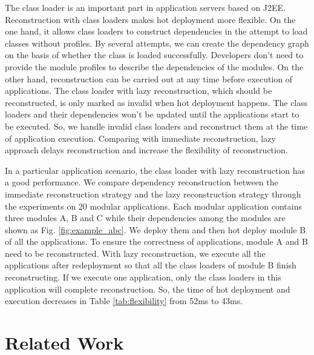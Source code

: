 \documentclass[conference]{IEEEtran}
\begin{document}
The class loader is an important part in application servers based on J2EE.
Reconstruction with class loaders makes hot deployment more flexible.
On the one hand, it allows class loaders to construct dependencies in the attempt to load classes without profiles.
By several attempts, we can create the dependency graph on the basis of whether the class is loaded successfully.
Developers don't need to provide the module profiles to describe the dependencies of the modules.
On the other hand, reconstruction can be carried out at any time before execution of applications.
The class loader with lazy reconstruction, which should be reconstructed, is only marked as invalid when hot deployment happens.
The class loaders and their dependencies won't be updated until the applications start to be executed.
So, we handle invalid class loaders and reconstruct them at the time of application execution.
Comparing with immediate reconstruction, lazy approach delays reconstruction and increase the flexibility of reconstruction.

In a particular application scenario, the class loader with lazy reconstruction has a good performance. 
We compare dependency reconstruction between the immediate reconstruction strategy and the lazy reconstruction strategy through the experiments on 20 modular applications.
Each modular application contains three modules A, B and C while their dependencies among the modules are shown as Fig. \ref{fig:example_abc}.
We deploy them and then hot deploy module B of all the applications.
To ensure the correctness of applications, module A and B need to be reconstructed.
With lazy reconstruction, we execute all the applications after redeployment so that all the class loaders of module B finish reconstructing.
If we execute one application, only the class loaders in this application will complete reconstruction.
So, the time of hot deployment and execution decreases in Table \ref{tab:flexibility} from 52ms to 43ms. 



\section{Related Work\label{sec:relatedwork}}

\end{document}
